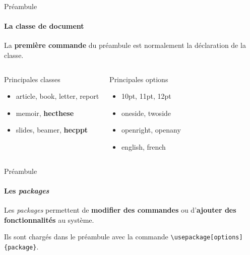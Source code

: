 \begin{frame}[fragile]{Préambule}
	\framesubtitle{La classe de document}
	La \textbf{première commande} du préambule est normalement la déclaration de la classe.
	

	\begin{columns}
		
		\pause
		
		\begin{HECcomparaison}{Principales classes}
			\begin{itemize}
				\item article, book, letter, report
				\item memoir, \textbf{hecthese}
				\item slides, beamer, \textbf{hecppt}
			\end{itemize}
		\end{HECcomparaison}
	
		\pause
		
		\begin{HECcomparaison}{Principales options}
			\begin{itemize}
				\item 10pt, 11pt, 12pt
				\item oneside, twoside
				\item openright, openany
				\item english, french
			\end{itemize}
		\end{HECcomparaison}
	\end{columns}
\end{frame}

\begin{frame}[fragile,c]{Préambule}
	\framesubtitle{Les \emph{packages}}
	Les \emph{packages} permettent de \textbf{modifier des commandes} ou d’\textbf{ajouter des fonctionnalités} au système.
	
	Ils sont chargés dans le préambule avec la commande \lstinline|\usepackage[options]{package}|.
	
\end{frame}

